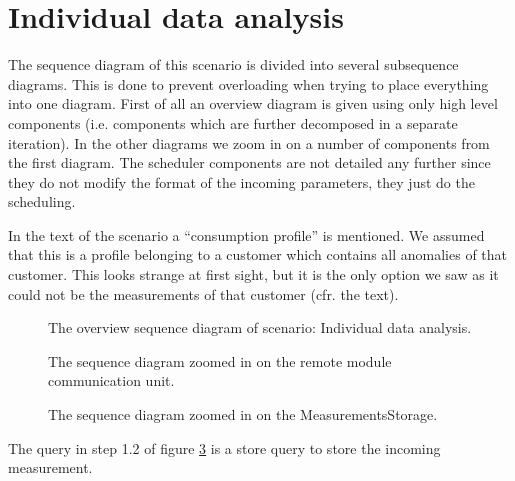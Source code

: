 \section{Individual data analysis}

\npar The sequence diagram of this scenario is divided into several subsequence
diagrams. This is done to prevent overloading when trying to place everything
into one diagram. First of all an overview diagram is given using only high
level components (i.e. components which are further decomposed in a separate
iteration). In the other diagrams we zoom in on a number of components from the
first diagram. The scheduler components are not detailed any further since they
do not modify the format of the incoming parameters, they just do the
scheduling.

\npar In the text of the scenario a ``consumption profile'' is mentioned. We
assumed that this is a profile belonging to a customer which contains all
anomalies of that customer. This looks strange at first sight, but it is the
only option we saw as it could not be the measurements of that customer (cfr.
the text).

\begin{figure}
	\begin{centering}
		\caption{The overview sequence diagram of scenario: Individual data analysis.}
		\label{fig:scenario-5-6}
	\end{centering}
\end{figure}

\begin{figure}
	\begin{centering}
		\caption{The sequence diagram zoomed in on the remote module communication
		unit.}
		\label{fig:scenario-5-6a}
	\end{centering}
\end{figure}

\begin{figure}
	\begin{centering}
		\caption{The sequence diagram zoomed in on the MeasurementsStorage.}
		\label{fig:scenario-5-6b}
	\end{centering}
\end{figure}

\npar The query in step 1.2 of figure \ref{fig:scenario-5-6b} is a store query
to store the incoming measurement.


